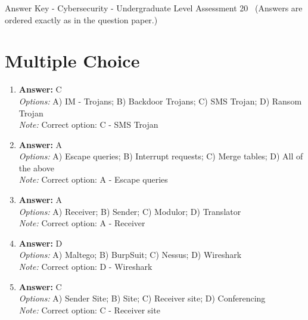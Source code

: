 \documentclass[12pt]{article}
\begin{document}
\begin{center}
Answer Key - Cybersecurity - Undergraduate Level Assessment 20 \
\small (Answers are ordered exactly as in the question paper.)
\end{center}

\section*{Multiple Choice}
\begin{enumerate}[label=\arabic*.]
\item \textbf{Answer:} C
\\ \textit{Options:} A) IM - Trojans; B) Backdoor Trojans; C) SMS Trojan; D) Ransom Trojan
\\ \textit{Note:} Correct option: C - SMS Trojan
\item \textbf{Answer:} A
\\ \textit{Options:} A) Escape queries; B) Interrupt requests; C) Merge tables; D) All of the above
\\ \textit{Note:} Correct option: A - Escape queries
\item \textbf{Answer:} A
\\ \textit{Options:} A) Receiver; B) Sender; C) Modulor; D) Translator
\\ \textit{Note:} Correct option: A - Receiver
\item \textbf{Answer:} D
\\ \textit{Options:} A) Maltego; B) BurpSuit; C) Nessus; D) Wireshark
\\ \textit{Note:} Correct option: D - Wireshark
\item \textbf{Answer:} C
\\ \textit{Options:} A) Sender Site; B) Site; C) Receiver site; D) Conferencing
\\ \textit{Note:} Correct option: C - Receiver site
\end{enumerate}
\end{document}
